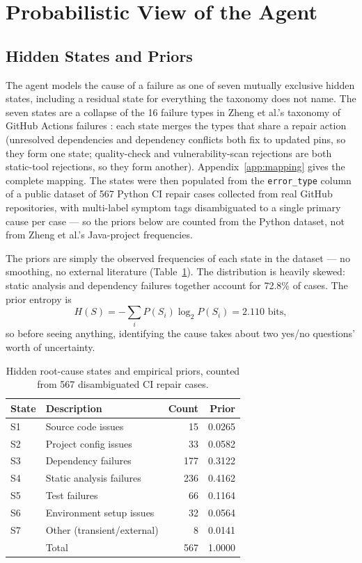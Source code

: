 \documentclass{article}
\begin{document}
\section{Probabilistic View of the Agent}
\label{sec:probabilistic}

\subsection{Hidden States and Priors}

The agent models the cause of a failure as one of seven mutually exclusive hidden states, including a residual state for everything the taxonomy does not name. The seven states are a collapse of the 16 failure types in Zheng et al.'s taxonomy of GitHub Actions failures \cite{zheng2025gha}: each state merges the types that share a repair action (unresolved dependencies and dependency conflicts both fix to updated pins, so they form one state; quality-check and vulnerability-scan rejections are both static-tool rejections, so they form another). Appendix~\ref{app:mapping} gives the complete mapping. The states were then populated from the \texttt{error\_type} column of a public dataset of 567 Python CI repair cases collected from real GitHub repositories, with multi-label symptom tags disambiguated to a single primary cause per case --- so the priors below are counted from the Python dataset, not from Zheng et al.'s Java-project frequencies.

The priors are simply the observed frequencies of each state in the dataset --- no smoothing, no external literature (Table~\ref{tab:priors}). The distribution is heavily skewed: static analysis and dependency failures together account for 72.8\% of cases. The prior entropy is
\[
H(S) = -\textstyle\sum_i P(S_i)\log_2 P(S_i) = 2.110 \text{ bits},
\]
so before seeing anything, identifying the cause takes about two yes/no questions' worth of uncertainty.

\begin{table}[t]
\centering
\small
\begin{tabular}{llrr}
\toprule
State & Description & Count & Prior \\
\midrule
S1 & Source code issues & 15 & 0.0265 \\
S2 & Project config issues & 33 & 0.0582 \\
S3 & Dependency failures & 177 & 0.3122 \\
S4 & Static analysis failures & 236 & 0.4162 \\
S5 & Test failures & 66 & 0.1164 \\
S6 & Environment setup issues & 32 & 0.0564 \\
S7 & Other (transient/external) & 8 & 0.0141 \\
\midrule
 & Total & 567 & 1.0000 \\
\bottomrule
\end{tabular}
\caption{Hidden root-cause states and empirical priors, counted from 567 disambiguated CI repair cases.}
\label{tab:priors}
\end{table}
\end{document}
